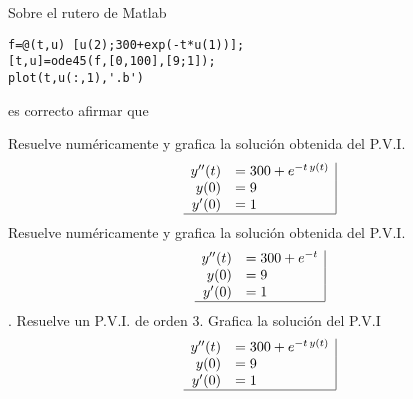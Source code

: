 \begin{pregunta}
\begin{cuerpo}
Sobre el rutero de Matlab
\begin{lstlisting}
f=@(t,u) [u(2);300+exp(-t*u(1))];
[t,u]=ode45(f,[0,100],[9;1]);
plot(t,u(:,1),'.b')
\end{lstlisting}
es correcto afirmar que
\end{cuerpo}
\begin{multicols}{2}
\begin{alternativas}
{Resuelve num\'ericamente y grafica la soluci\'on obtenida del P.V.I.
$$
\begin{array}{rl|}
y''(t) &=300+e^{-t \, y(t)} \\
y(0)	&=9\\
y'(0)	&=1\\ \hline
\end{array}
$$
}
{Resuelve num\'ericamente y grafica la soluci\'on obtenida del P.V.I.
$$
\begin{array}{rl|}
y''(t) &=300+e^{-t } \\
y(0)	&=9\\
y'(0)	&=1\\ \hline
\end{array}
$$.}
{Resuelve un P.V.I. de orden 3.}
{Grafica la soluci\'on del P.V.I
$$
\begin{array}{rl|}
y''(t) &=300+e^{-t \, y(t)} \\
y(0)	&=9\\
y'(0)	&=1\\ \hline
\end{array}
$$
}
\end{alternativas}
\end{multicols}
\justificacion{0cm}
\end{pregunta}